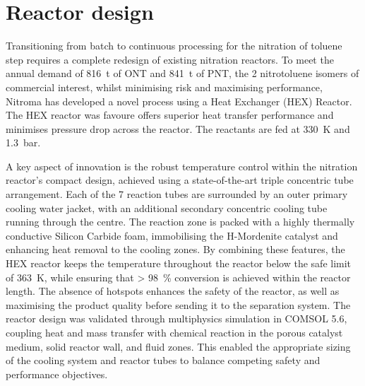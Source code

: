 \section*{Reactor design}
Transitioning from batch to continuous processing for the nitration of toluene step requires a complete redesign of existing nitration reactors. To meet the annual demand of \SI{816}{\tonne} of ONT and \SI{841}{\tonne} of PNT, the 2 nitrotoluene isomers of commercial interest, whilst minimising risk and maximising performance, Nitroma has developed a novel process using a Heat Exchanger (HEX) Reactor. The HEX reactor was favoure offers superior heat transfer performance and minimises pressure drop across the reactor. The reactants are fed at \SI{330}{\K} and \SI{1.3}{bar}.

A key aspect of innovation is the robust temperature control within the nitration reactor's compact design, achieved using a state-of-the-art triple concentric tube arrangement. Each of the 7 reaction tubes are surrounded by an outer primary cooling water jacket, with an additional secondary concentric cooling tube running through the centre. The reaction zone is packed with a highly thermally conductive Silicon Carbide foam, immobilising the H-Mordenite catalyst and enhancing heat removal to the cooling zones. By combining these features, the HEX reactor keeps the temperature throughout the reactor below the safe limit of \SI{363}{\K}, while ensuring that \SI{> 98}{\percent} conversion is achieved within the reactor length. The absence of hotspots enhances the safety of the reactor, as well as maximising the product quality before sending it to the separation system. The reactor design was validated through multiphysics simulation in COMSOL 5.6, coupling heat and mass transfer with chemical reaction in the porous catalyst medium, solid reactor wall, and fluid zones. This enabled the appropriate sizing of the cooling system and reactor tubes to balance competing safety and performance objectives.

